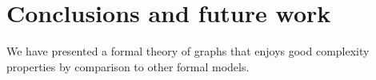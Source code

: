 \section{Conclusions and future work}

We have presented a formal theory of graphs that enjoys good
complexity properties by comparison to other formal models.



